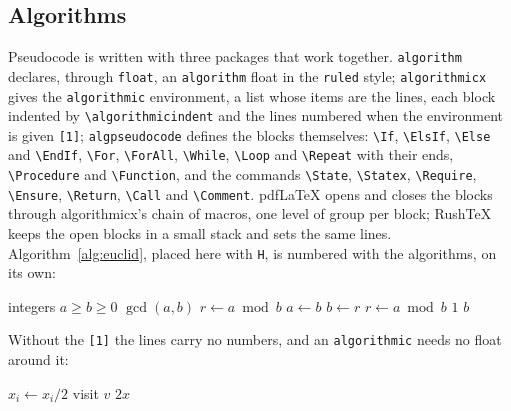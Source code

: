 \documentclass{article}
\numberwithin{equation}{section}
\theoremstyle{definition}
\theoremstyle{remark}
\begin{document}
\subsection{Algorithms}\label{sec:algorithms}
Pseudocode is written with three packages that work together. \texttt{algorithm} declares,
through \texttt{float}, an \texttt{algorithm} float in the \texttt{ruled} style;
\texttt{algorithmicx} gives the \texttt{algorithmic} environment, a list whose items are the
lines, each block indented by \verb|\algorithmicindent| and the lines numbered when the
environment is given \texttt{[1]}; \texttt{algpseudocode} defines the blocks themselves:
\verb|\If|, \verb|\ElsIf|, \verb|\Else| and \verb|\EndIf|, \verb|\For|, \verb|\ForAll|,
\verb|\While|, \verb|\Loop| and \verb|\Repeat| with their ends, \verb|\Procedure| and
\verb|\Function|, and the commands \verb|\State|, \verb|\Statex|, \verb|\Require|,
\verb|\Ensure|, \verb|\Return|, \verb|\Call| and \verb|\Comment|. pdfLaTeX opens and closes
the blocks through algorithmicx's chain of macros, one level of group per block; RushTeX
keeps the open blocks in a small stack and sets the same lines. Algorithm~\ref{alg:euclid},
placed here with \texttt{H}, is numbered with the algorithms, on its own:
\begin{algorithm}[H]
\caption{Euclid's algorithm}\label{alg:euclid}
\begin{algorithmic}[1]
\Require integers $a \ge b \ge 0$
\Ensure $\gcd(a, b)$
  \State $r\gets a\bmod b$
    \State $a\gets b$
    \State $b\gets r$
    \State $r\gets a\bmod b$
  \EndWhile
    \State \Return $1$
    \State \Return {}
  \Else
    \State \Return $b$
  \EndIf
\EndProcedure
\end{algorithmic}
\end{algorithm}
Without the \texttt{[1]} the lines carry no numbers, and an \texttt{algorithmic} needs no
float around it:
\begin{algorithmic}
  \Repeat
    \State $x_i \gets x_i / 2$
\EndFor
{}
  \State visit $v$
\EndFor
\Statex
{}
  \State \Return $2x$
\EndFunction
\end{algorithmic}
\end{document}
